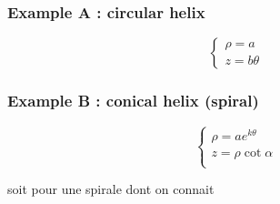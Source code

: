 \subsubsection{Example A : circular helix}
\begin{equation}
	\left\{
	\begin{array}{c}
		\rho = a\\
		z = b\theta
	\end{array}\right.
\end{equation}

\subsubsection{Example B : conical helix (spiral)}
\begin{equation}
	\left\{
	\begin{array}{c}
		\rho = a e^{k\theta}\\
		z = \rho \cot{\alpha}\\
	\end{array}\right.
\end{equation}


soit pour une spirale dont on connait

